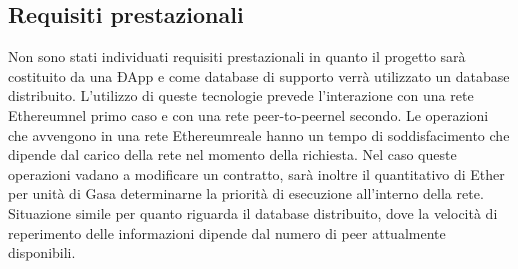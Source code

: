 \subsection{Requisiti prestazionali}
Non sono stati individuati requisiti prestazionali in quanto il progetto sarà costituito da una ÐApp\glo{} e come database di supporto verrà utilizzato un database distribuito. L'utilizzo di queste tecnologie prevede l'interazione con una rete Ethereum\glosp nel primo caso e con una rete peer-to-peer\glosp nel secondo. Le operazioni che avvengono in una rete Ethereum\glosp reale hanno un tempo di soddisfacimento che dipende dal carico della rete nel momento della richiesta. Nel caso queste operazioni vadano a modificare un contratto, sarà inoltre il quantitativo di Ether per unità di Gas\glosp a determinarne la priorità di esecuzione all'interno della rete. Situazione simile per quanto riguarda il database distribuito, dove la velocità di reperimento delle informazioni dipende dal numero di peer attualmente disponibili.